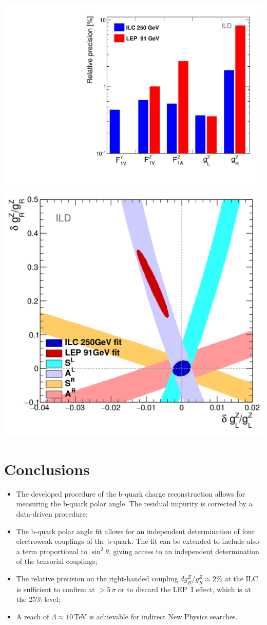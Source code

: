 \begin{center}
	\includegraphics[width=0.45\linewidth]{plots/final-graph-ild.pdf}
	\includegraphics[width=0.45\linewidth]{plots/ilc-precision-ild.png}
		\label{fig:LEPILCResult_3}
\end{center}\vspace{0.5cm}


\color{Blue} %

\section*{Conclusions}

\begin{itemize}
\item The developed procedure of the b-quark charge reconstruction allows for measuring the b-quark polar angle. The residual impurity is corrected by a data-driven procedure;
\item The b-quark polar angle fit allows for an independent determination of four electroweak couplings of the b-quark. The fit can be extended to include also a term proportional to $\sin^2\theta$, giving access to an independent determination of the tensorial couplings;
\item  The relative precision on the right-handed coupling $dg^Z_R/g^Z_R\approx 2$\% at the ILC is sufficient to confirm at $>5\,\sigma$ or to discard the LEP~I effect, which is at the 25\% level;
\item A reach of $\Lambda \approx 10$\,TeV is achievable for indirect New Physics searches.
\end{itemize}

